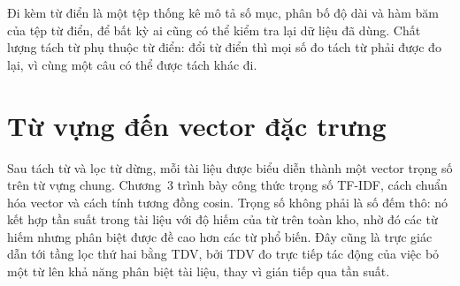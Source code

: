 Đi kèm từ điển là một tệp thống kê mô tả số mục, phân bố độ dài và hàm băm của
tệp từ điển, để bất kỳ ai cũng có thể kiểm tra lại dữ liệu đã dùng. Chất lượng
tách từ phụ thuộc từ điển: đổi từ điển thì mọi số đo tách từ phải được đo lại, vì
cùng một câu có thể được tách khác đi.

\section{Từ vựng đến vector đặc trưng}

Sau tách từ và lọc từ dừng, mỗi tài liệu được biểu diễn thành một vector trọng số
trên từ vựng chung. Chương~3 trình bày công thức trọng số TF-IDF, cách chuẩn hóa
vector và cách tính tương đồng cosin. Trọng số không phải là số đếm thô: nó kết
hợp tần suất trong tài liệu với độ hiếm của từ trên toàn kho, nhờ đó các từ hiếm
nhưng phân biệt được đề cao hơn các từ phổ biến. Đây cũng là trực giác dẫn tới
tầng lọc thứ hai bằng TDV, bởi TDV đo trực tiếp tác động của việc bỏ một từ lên
khả năng phân biệt tài liệu, thay vì gián tiếp qua tần suất.
